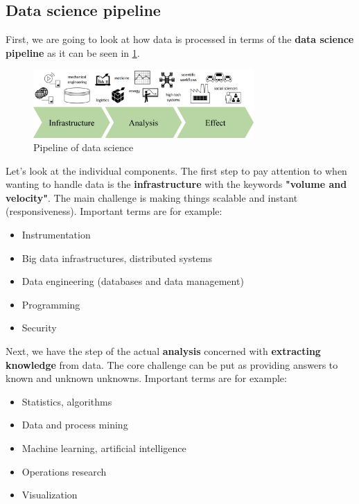 \subsection{Data science pipeline}
First, we are going to look at how data is processed in terms of the \textbf{data science pipeline} as it can be seen in \ref{fig:1_pipeline}. 

\begin{figure}[H]
  \centering
  \includegraphics[width=0.75\textwidth]{assets/basics/pipeline.png}
  \caption{Pipeline of data science}
  \label{fig:1_pipeline}
\end{figure}

Let's look at the individual components. The first step to pay attention to when wanting to handle data is the \textbf{infrastructure} with the keywords \textbf{"volume and velocity"}. The main challenge is making things scalable and instant (responsiveness). Important terms are for example:
\begin{itemize}
  \item Instrumentation
  \item Big data infrastructures, distributed systems
  \item Data engineering (databases and data management)
  \item Programming
  \item Security
\end{itemize}

Next, we have the step of the actual \textbf{analysis} concerned with \textbf{extracting knowledge} from data. The core challenge can be put as providing answers to known and unknown unknowns. Important terms are for example:
\begin{itemize}
  \item Statistics, algorithms
  \item Data and process mining
  \item Machine learning, artificial intelligence
  \item Operations research
  \item Visualization
\end{itemize}

